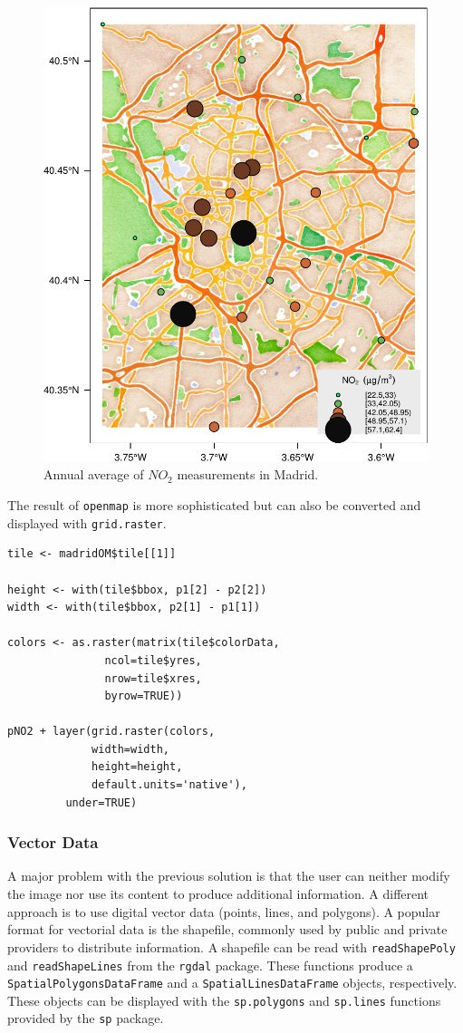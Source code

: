 \begin{figure}[htb]
\centering
\includegraphics[width=.9\linewidth]{figs/airMadrid_stamen.pdf}
\caption{\label{fig:airMadrid_stamen}Annual average of $NO_2$ measurements in Madrid.}
\end{figure}

The result of \texttt{openmap} is more sophisticated but can also be
converted and displayed with \texttt{grid.raster}.
\lstset{language=R,numbers=none}
\begin{lstlisting}
tile <- madridOM$tile[[1]]

height <- with(tile$bbox, p1[2] - p2[2])
width <- with(tile$bbox, p2[1] - p1[1])

colors <- as.raster(matrix(tile$colorData,
			   ncol=tile$yres,
			   nrow=tile$xres,
			   byrow=TRUE))

pNO2 + layer(grid.raster(colors,
			 width=width,
			 height=height,
			 default.units='native'),
	     under=TRUE)
\end{lstlisting}
\subsubsection{Vector Data}
\label{sec-1-4-2}
A major problem with the previous solution is that the user can
neither modify the image nor use its content to produce additional
information.  A different approach is to use digital vector data
(points, lines, and polygons). A popular format for vectorial data is
the shapefile, commonly used by public and private providers to
distribute information. A shapefile can be read with \texttt{readShapePoly}
and \texttt{readShapeLines} from the \texttt{rgdal} package. These functions produce
a \texttt{SpatialPolygonsDataFrame} and a \texttt{SpatialLinesDataFrame} objects,
respectively. These objects can be displayed with the \texttt{sp.polygons}
and \texttt{sp.lines} functions provided by the \texttt{sp} package.

